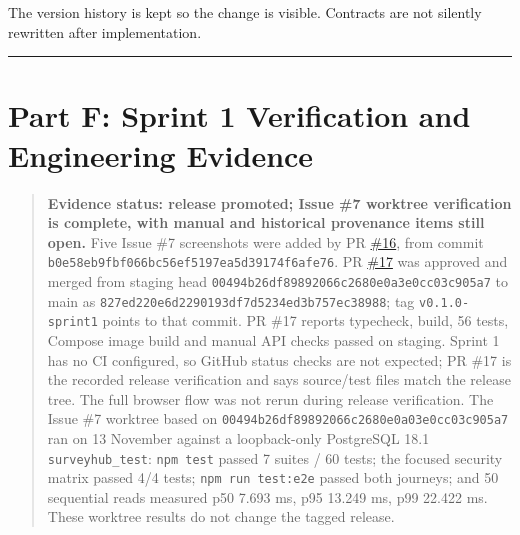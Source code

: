 \documentclass[12pt,a4paper]{article}
\begin{document}
The version history is kept so the change is visible. Contracts are not silently rewritten after implementation.

\medskip\noindent\rule{\linewidth}{0.4pt}\medskip


\label{part-e-end}
\clearpage

\clearpage
\section{Part F: Sprint 1 Verification and Engineering Evidence}

\label{part-f-start}

\begin{quote}
\textbf{Evidence status: release promoted; Issue \#7 worktree verification is complete, with manual and historical provenance items still open.} Five Issue \#7 screenshots were added by PR \href{https://github.com/Snnn3/SurveyHub/pull/16}{\#16}, from commit \texttt{b0e58eb9\allowbreak fbf066bc\allowbreak 56ef5197\allowbreak ea5d3917\allowbreak 4f6afe76}. PR \href{https://github.com/Snnn3/SurveyHub/pull/17}{\#17} was approved and merged from staging head \texttt{00494b26\allowbreak df898920\allowbreak 66c2680e\allowbreak 0a3e0cc0\allowbreak 3c905a7} to main as \texttt{827ed220\allowbreak e6d22901\allowbreak 93df7d52\allowbreak 34ed3b75\allowbreak 7ec38988}; tag \texttt{v0.1.0-sprint1} points to that commit. PR \#17 reports typecheck, build, 56 tests, Compose image build and manual API checks passed on staging. Sprint 1 has no CI configured, so GitHub status checks are not expected; PR \#17 is the recorded release verification and says source/test files match the release tree. The full browser flow was not rerun during release verification. The Issue \#7 worktree based on \texttt{00494b26df89892066c2680e0a03e0cc03c905a7} ran on 13 November against a loopback-only PostgreSQL 18.1 \texttt{surveyhub\_test}: \texttt{npm test} passed 7 suites / 60 tests; the focused security matrix passed 4/4 tests; \texttt{npm run test:e2e} passed both journeys; and 50 sequential reads measured p50 7.693 ms, p95 13.249 ms, p99 22.422 ms. These worktree results do not change the tagged release.
\end{quote}
\end{document}
